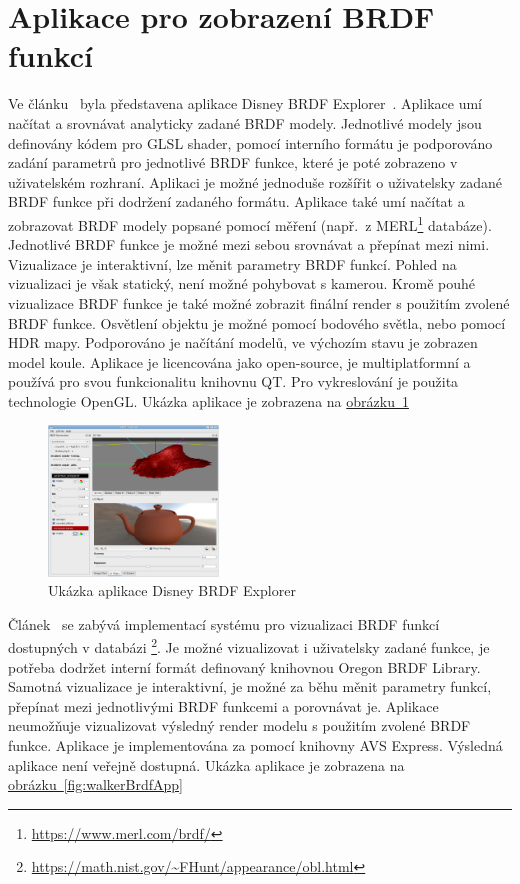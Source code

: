 \documentclass[czech,master]{diploma}
\begin{document}
\section{Aplikace pro zobrazení BRDF funkcí}
Ve článku~\cite{DisneyBRDF} byla představena aplikace Disney BRDF Explorer~\cite{sourceDisneyBRDF}. Aplikace umí načítat a srovnávat analyticky zadané BRDF modely. Jednotlivé modely jsou definovány kódem pro GLSL shader, pomocí interního formátu je podporováno zadání parametrů pro jednotlivé BRDF funkce, které je poté zobrazeno v uživatelském rozhraní. Aplikaci je možné jednoduše rozšířit o uživatelsky zadané BRDF funkce při dodržení zadaného formátu. Aplikace také umí načítat a zobrazovat BRDF modely popsané pomocí měření (např.\ z MERL\footnote{\url{https://www.merl.com/brdf/}} databáze). Jednotlivé BRDF funkce je možné mezi sebou srovnávat a přepínat mezi nimi. Vizualizace je interaktivní, lze měnit parametry BRDF funkcí. Pohled na vizualizaci je však statický, není možné pohybovat s kamerou. Kromě pouhé vizualizace BRDF funkce je také možné zobrazit finální render s použitím zvolené BRDF funkce. Osvětlení objektu je možné pomocí bodového světla, nebo pomocí HDR mapy. Podporováno je načítání modelů, ve výchozím stavu je zobrazen model koule. Aplikace je licencována jako open-source, je multiplatformní a používá pro svou funkcionalitu knihovnu QT\@. Pro vykreslování je použita technologie OpenGL\@. Ukázka aplikace je zobrazena na \hyperref[fig:disneyBrdfApp]{obrázku~\ref{fig:disneyBrdfApp}}\par

\begin{figure}[ht]
  \centering
  \includegraphics[height=4cm]{Figures/disneyBRDFApp.png}
  \caption{Ukázka aplikace Disney BRDF Explorer~\cite{DisneyBRDF}}%
  \label{fig:disneyBrdfApp}%
\end{figure}

Článek~\cite{brdfviz} se zabývá implementací systému pro vizualizaci BRDF funkcí dostupných v databázi \footnote{\url{https://math.nist.gov/~FHunt/appearance/obl.html}}. Je možné vizualizovat i uživatelsky zadané funkce, je potřeba dodržet interní formát definovaný knihovnou Oregon BRDF Library. Samotná vizualizace je interaktivní, je možné za běhu měnit parametry funkcí, přepínat mezi jednotlivými BRDF funkcemi a porovnávat je. Aplikace neumožňuje vizualizovat výsledný render modelu s použitím zvolené BRDF funkce. Aplikace je implementována za pomocí knihovny AVS Express. Výsledná aplikace není veřejně dostupná. Ukázka aplikace je zobrazena na \hyperref[fig:walkerBrdfApp]{obrázku~\ref{fig:walkerBrdfApp}}\par
\end{document}
